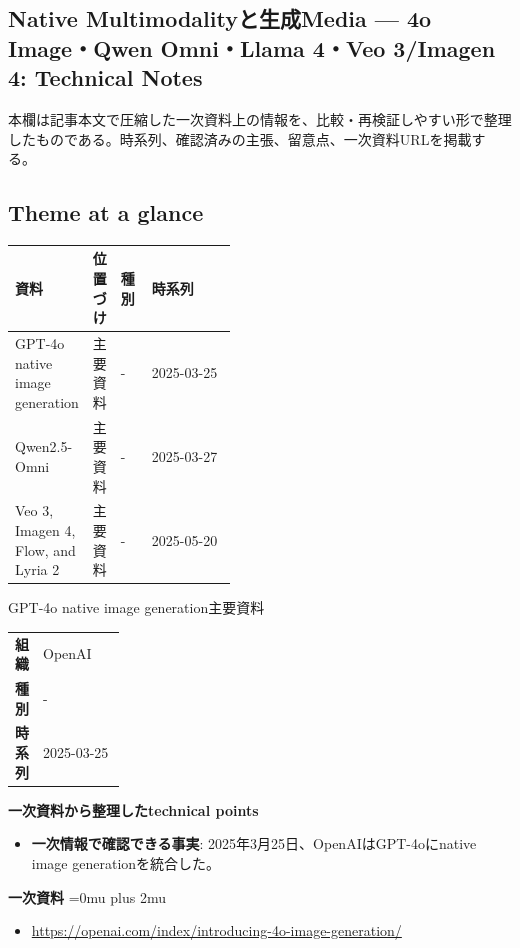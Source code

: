 \subsection*{Native Multimodalityと生成Media — 4o Image・Qwen Omni・Llama 4・Veo 3/Imagen 4: Technical Notes}
本欄は記事本文で圧縮した一次資料上の情報を、比較・再検証しやすい形で整理したものである。時系列、確認済みの主張、留意点、一次資料URLを掲載する。
\medskip
\subsection*{Theme at a glance}
\begin{center}
\footnotesize
\begin{tabularx}{\linewidth}{@{}p{0.20\linewidth}p{0.10\linewidth}p{0.14\linewidth}X@{}}
\toprule
資料 & 位置づけ & 種別 & 時系列 \\
\midrule
GPT-4o native image generation & 主要資料 & - & 2025-03-25   \\
Qwen2.5-Omni & 主要資料 & - & 2025-03-27   \\
Veo 3, Imagen 4, Flow, and Lyria 2 & 主要資料 & - & 2025-05-20   \\
\bottomrule
\end{tabularx}
\end{center}
\normalsize

\begin{technicalnote}{GPT-4o native image generation}{主要資料}
\begingroup
\begin{tabularx}{\linewidth}{@{}>{\bfseries}p{0.22\linewidth}X@{}}
組織 & OpenAI \\
種別 & - \\
時系列 & 2025-03-25 \\
\end{tabularx}
\smallskip
{\bfseries 一次資料から整理したtechnical points}
\begin{itemize}[leftmargin=1.5em,itemsep=0.35em]
\item \textbf{一次情報で確認できる事実}: 2025年3月25日、OpenAIはGPT-4oにnative image generationを統合した。
\end{itemize}
\begin{samepage}
{\bfseries 一次資料}
\begingroup\sloppy
\Urlmuskip=0mu plus 2mu\relax
\begin{itemize}[leftmargin=1.5em,itemsep=0.25em]
\item {\scriptsize\url{https://openai.com/index/introducing-4o-image-generation/}}
\end{itemize}
\endgroup
\end{samepage}
\endgroup
\end{technicalnote}
\medskip

